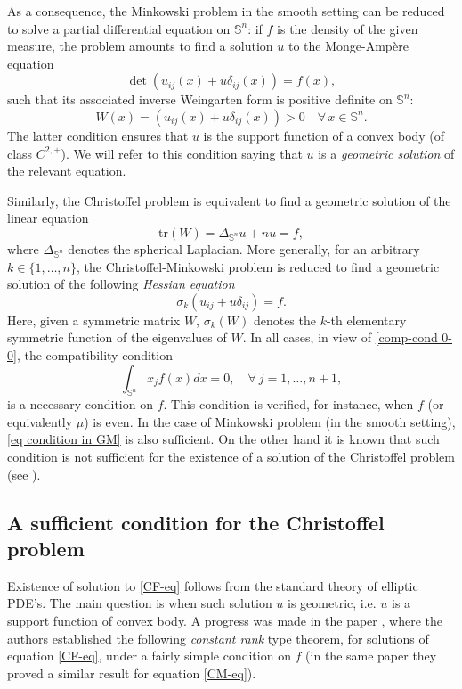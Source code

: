 \documentclass[12pt]{amsart}
\newcommand{\1}{\mathbf 1}
\newcommand{\sfe}{{{\mathbb S}^{n}}}
\begin{document}
As a consequence, the Minkowski problem in the smooth setting can be reduced to solve a partial differential equation on $\sfe$: if $f$ is the density of the given measure, the problem amounts to find a solution $u$ to the Monge-Amp\`ere equation
$$
\det(u_{ij}(x)+u\delta_{ij}(x))=f(x),
$$
such that its associated inverse Weingarten form is positive definite on $\sfe$:
\begin{equation}\label{geometric solution}
W(x)=(u_{ij}(x)+u\delta_{ij}(x))>0\quad\forall\, x\in\sfe.
\end{equation}
The latter condition ensures that $u$ is the support function of a convex body (of class $C^{2,+}$). We will refer to this condition saying that $u$ is a {\em geometric solution} of the relevant equation. 

Similarly, the Christoffel problem is equivalent to find a geometric solution of the linear equation
\begin{equation}\label{CF-eq} 
\mbox{tr}(W)=\Delta_{\mathbb S^n} u+nu =f,
\end{equation}
where $\Delta_{\sfe}$ denotes the spherical Laplacian. More generally, for an arbitrary $k\in\{1,\dots,n\}$, the Christoffel-Minkowski problem is reduced to find a geometric solution of the following {\em Hessian equation}
\begin{equation}\label{CM-eq}
\sigma_k(u_{ij}+u\delta_{ij})=f.
\end{equation}
Here, given a symmetric matrix $W$, $\sigma_k(W)$ denotes the $k$-th elementary symmetric function of the eigenvalues of $W$. In all cases, in view of \eqref{comp-cond 0-0}, the compatibility condition
\begin{equation}\label{eq condition in GM}
\int_{\mathbb S^n}x_j f(x)dx=0,\quad\forall\ j=1,\dots,n+1,    
\end{equation}
is a necessary condition on $f$. This condition is verified, for instance, when $f$ (or equivalently $\mu$) is even. In the case of Minkowski problem (in the smooth setting), \eqref{eq condition in GM} is also sufficient. On the other hand it is known that such condition is not sufficient for the existence of a solution of the Christoffel problem (see \cite[Section 8.3]{Schneider}). 

\subsection{A sufficient condition for the Christoffel problem} Existence of solution to \eqref{CF-eq} follows from the standard theory of elliptic PDE's. The main question is when such solution $u$ is geometric, i.e. $u$ is a support function of convex body. A progress was made in the paper \cite{Guan-Ma-2003}, where the authors established the following {\em constant rank} type theorem, for solutions of equation \eqref{CF-eq}, under a fairly simple condition on $f$ (in the same paper they proved a similar result for equation \eqref{CM-eq}). 
\end{document}
